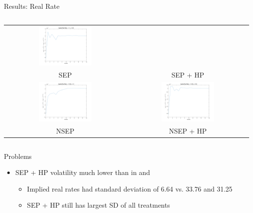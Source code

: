 \documentclass{beamer}
\begin{document}
\begin{frame}{Results: Real Rate}
\begin{columns}
\begin{tabular}{cc}
  \includegraphics[width=0.45\textwidth]{figs/irf/real_implied_2.png} \\
  SEP & SEP + HP \\
  \includegraphics[width=0.45\textwidth]{figs/irf/real_implied_3.png} &
  \includegraphics[width=0.45\textwidth]{figs/irf/real_implied_4.png} \\
  NSEP & NSEP + HP
\end{tabular}
\end{columns}
\end{frame}


\begin{frame}{Problems}
\begin{itemize}
\item SEP + HP volatility much lower than in \cite{collard11} and \cite{canzoneri07}
  \begin{itemize}
  \item Implied real rates had standard deviation of 6.64 vs. 33.76 and 31.25
  \item SEP + HP still has largest SD of all treatments
  \end{itemize}
\end{itemize}
\end{frame}
\end{document}
